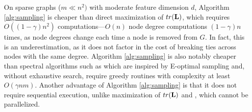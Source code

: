 On sparse graphs ($m \ll n^2)$ with moderate feature dimension $d$, Algorithm \ref{alg:sampling} is cheaper than direct maximization of $tr({\mathbf L})$, which requires $O((1-\gamma)n^2)$ computations---$O(n)$ node degree computations $(1-\gamma)n$ times, as node degrees change each time a node is removed from $G$. In fact, this is an underestimation, as it does not factor in the cost of breaking ties across nodes with the same degree. Algorithm \ref{alg:sampling} is also notably cheaper than spectral algorithms such as \cite{chen2015discrete, anis2016efficient} which are inspired by E-optimal sampling and, without exhaustive search, require greedy routines with complexity at least $O(\gamma nm)$. Another advantage of Algorithm \ref{alg:sampling} is that it does not require sequential execution, unlike maximization of $tr({\mathbf L})$ and \cite{chen2015discrete,anis2016efficient}, which cannot be parallelized.

